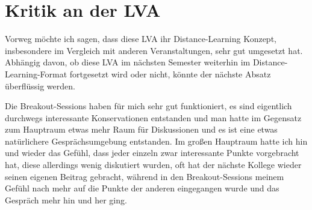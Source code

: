 \documentclass[twoside, a4paper, DIV=11, open=any, bibliography=totoc]{scrbook}
\begin{document}
\section{Kritik an der LVA} \label{sec:}

Vorweg möchte ich sagen, dass diese LVA ihr Distance-Learning Konzept,
insbesondere im Vergleich mit anderen Veranstaltungen, sehr gut umgesetzt hat.
Abhängig davon, ob diese LVA im nächsten Semester weiterhin im Distance-Learning-Format
fortgesetzt wird oder nicht, könnte der nächste Absatz überflüssig werden.


Die Breakout-Sessions haben für mich sehr gut funktioniert,
es sind eigentlich durchwegs interessante Konservationen entstanden und
man hatte im Gegensatz zum Hauptraum etwas mehr Raum für Diskussionen
und es ist eine etwas natürlichere Gesprächsumgebung entstanden.
Im großen Hauptraum hatte ich hin und wieder das Gefühl, dass jeder einzeln
zwar interessante Punkte vorgebracht hat, diese allerdings wenig diskutiert wurden,
oft hat der nächste Kollege wieder seinen eigenen Beitrag gebracht,
während in den Breakout-Sessions meinem Gefühl nach mehr auf die Punkte der
anderen eingegangen wurde und das Gespräch mehr hin und her ging. 





\end{document}
